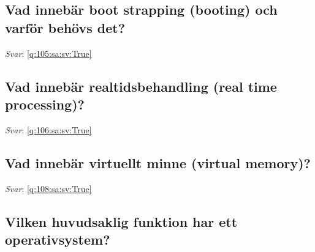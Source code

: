 \documentclass[a4paper,11pt,oneside]{article}
\begin{document}
\begin{sloppypar}
\subsection{Vad inneb\"ar boot strapping (booting) och varf\"or beh\"ovs det?}

\label{q:105:sa:sv:False}

\vspace{2cm}

\noindent\makebox[\textwidth]{\hrulefill}

\vspace{1cm}

\textit{Svar}: \autoref{q:105:sa:sv:True}



\subsection{Vad inneb\"ar realtidsbehandling (real time processing)?}

\label{q:106:sa:sv:False}

\vspace{2cm}

\noindent\makebox[\textwidth]{\hrulefill}

\vspace{1cm}

\textit{Svar}: \autoref{q:106:sa:sv:True}



\subsection{Vad inneb\"ar virtuellt minne (virtual memory)?}

\label{q:108:sa:sv:False}

\vspace{2cm}

\noindent\makebox[\textwidth]{\hrulefill}

\vspace{1cm}

\textit{Svar}: \autoref{q:108:sa:sv:True}



\subsection{Vilken huvudsaklig funktion har ett operativsystem?}

\label{q:109:sa:sv:False}

\vspace{2cm}


\end{sloppypar}
\end{document}
